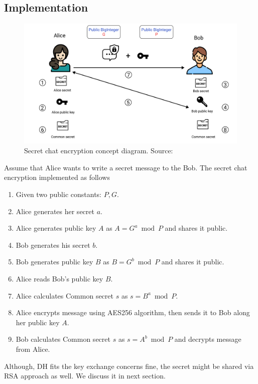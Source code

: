 \subsection{Implementation}\label{subsec:implementation}
\begin{figure}[H]
    \centering
    \includegraphics[width=1\textwidth]{Pictures/Key_Exchange}
    \caption{Secret chat encryption concept diagram. Source: }\label{fig:figure7}
\end{figure}
Assume that Alice wants to write a secret message to the Bob.
The secret chat encryption implemented as follows
\begin{enumerate}
    \item Given two public constants: $P, G$.
    \item Alice generates her secret $a$.
    \item Alice generates public key $A$ as $A=G^a \bmod P$ and shares it public.
    \item Bob generates his secret $b$.
    \item Bob generates public key $B$ as $B=G^b \bmod P$ and shares it public.
    \item Alice reads Bob's public key $B$.
    \item Alice calculates Common secret $s$ as $s = B^a \bmod P$.
    \item Alice encrypts message using AES256 algorithm, then sends it to Bob along her public key $A$.
    \item Bob calculates Common secret $s$ as $s = A^b \bmod P$ and decrypts message from Alice.
\end{enumerate}
Although, DH fits the key exchange concerns fine, the secret might be shared via RSA approach as well.
We discuss it in next section.